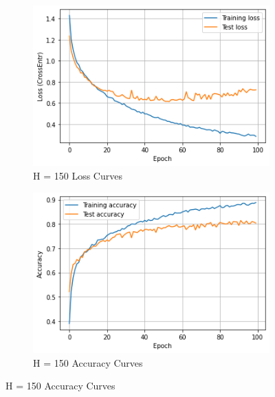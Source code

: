 \documentclass{homework}
\begin{document}
\begin{figure}[H]
\medskip
\begin{subfigure}{0.4\textwidth}
\includegraphics[width=\linewidth]{hw3_h150_loss.png}
\caption{H = 150 Loss Curves} \label{fig:c}
\end{subfigure}\hspace*{\fill}
\begin{subfigure}{0.4\textwidth}
\includegraphics[width=\linewidth]{hw3_h150_acc.png}
\caption{H = 150 Accuracy Curves} \label{fig:d}
\end{subfigure}


\end{figure}
\end{document}
